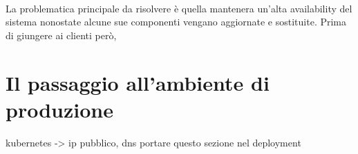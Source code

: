 \paragraph{}
La problematica principale da risolvere è quella mantenera un'alta availability del sistema nonostate alcune sue componenti vengano aggiornate e sostituite. Prima di giungere ai clienti però, 

\section{Il passaggio all'ambiente di produzione}
kubernetes -> ip pubblico, dns
portare questo sezione nel deployment


